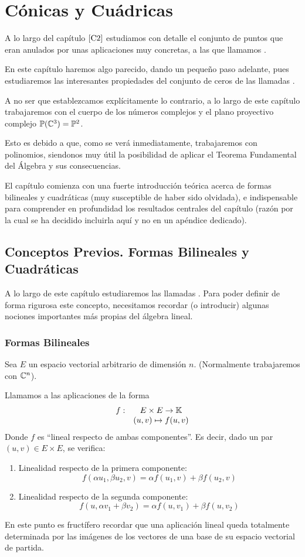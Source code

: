 \chapter{Cónicas y Cuádricas}
\label{C8}
A lo largo del capítulo $\ref{C2}$ estudiamos con detalle el conjunto de puntos que eran anulados por unas aplicaciones muy concretas, a las que llamamos .

En este capítulo haremos algo parecido, dando un pequeño paso adelante, pues estudiaremos las interesantes propiedades del conjunto de ceros de las llamadas .

A no ser que establezcamos explícitamente lo contrario, a lo largo de este capítulo trabajaremos con el cuerpo de los números complejos y el plano proyectivo complejo $\mathbb{P}(\mathbb{C}^3)=\mathbb{P}^2$. 

Esto es debido a que, como se verá inmediatamente, trabajaremos con polinomios, siendonos muy útil la posibilidad de aplicar el Teorema Fundamental del Álgebra y sus consecuencias.

El capítulo comienza con una fuerte introducción teórica acerca de formas bilineales y cuadráticas (muy susceptible de haber sido olvidada), e indispensable para comprender en profundidad los resultados centrales del capítulo (razón por la cual se ha decidido incluirla aquí y no en un apéndice dedicado).

\section{Conceptos Previos. Formas Bilineales y Cuadráticas}
A lo largo de este capítulo estudiaremos las llamadas . Para poder definir de forma rigurosa este concepto, necesitamos recordar (o introducir) algunas nociones importantes más propias del álgebra lineal.
\subsection{Formas Bilineales}
Sea $E$ un espacio vectorial arbitrario de dimensión $n$. (Normalmente trabajaremos con $\mathbb{C}^n$).
\begin{defi}
	\label{C8_def_formaBilineal}
	Llamamos  a las aplicaciones de la forma \[\begin{array}{cc}f:&E\times E\to\mathbb{K}\\
	& (u,v)\mapsto f(u,v)\end{array}\]
	Donde $f$ es ``lineal respecto de ambas componentes''. Es decir, dado un par $(u,v)\in E\times E$, se verifica:
	\begin{enumerate}
		\item Linealidad respecto de la primera componente: \[f(\alpha u_1,\beta u_2, v)=\alpha f(u_1,v)+\beta f(u_2,v)\]
		\item Linealidad respecto de la segunda componente:
		\[f(u,\alpha v_1 +\beta v_2)=\alpha f(u,v_1)+\beta f(u,v_2)\]
	\end{enumerate}
\end{defi}
En este punto es fructífero recordar que una aplicación lineal queda totalmente determinada por las imágenes de los vectores de una base de su espacio vectorial de partida.

